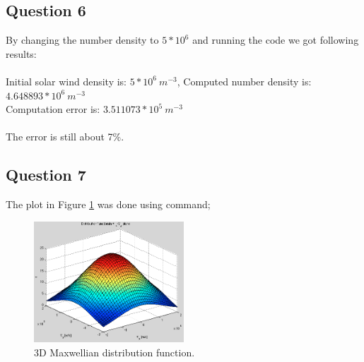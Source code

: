 \documentclass{article}
\begin{document}
\subsection{Question 6}
By changing the number density to $5*10^6$ and running the code we got following results:\\
\\
Initial solar wind density is: $5*10^6\:m^{-3}$, Computed number density is: $4.648893*10^6\:m^{-3}$\\
Computation error is: $3.511073*10^5\:m^{-3}$\\
\\
The error is still about 7\%.


\subsection{Question 7}
The plot in Figure \ref{fig:plot7} was done using  command;

\begin{figure}[h!bt]
\centering
\includegraphics[width=0.5\textwidth]{Figures/plot_7.png}
\caption{3D Maxwellian distribution function.}
\label{fig:plot7}
\end{figure}
\end{document}

